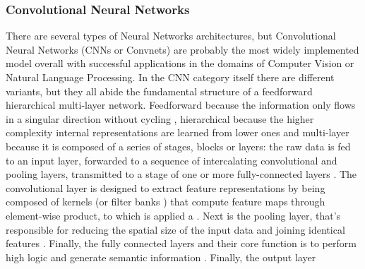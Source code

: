 \documentclass[class=report, crop=false, a4paper, 12pt]{standalone}
\begin{document}
\subsubsection{Convolutional Neural Networks}
There are several types of Neural Networks architectures, but Convolutional Neural Networks (CNNs or Convnets) are probably the most widely implemented model overall \autocite{yamashitaConvolutionalNeuralNetworks2018, liSurveyConvolutionalNeural2022} with successful applications in the domains of Computer Vision \autocite{krizhevskyImageNetClassificationDeep2012,taigmanDeepFaceClosingGap2014,tompsonEfficientObjectLocalization2015, zhangImprovedBreastCancer2021} or Natural Language Processing\autocite{abdel-hamidConvolutionalNeuralNetworks2014, wangGenCNNConvolutionalArchitecture2015, xiangConvolutionalNeuralNetworkbased2020}. In the CNN category itself there are different variants, but they all abide the fundamental structure of a feedforward hierarchical multi-layer network. Feedforward because the information only flows in a singular direction without cycling \autocite{zellSimulationNeuronalerNetze1994}, hierarchical because the higher complexity internal representations are learned from lower ones \autocite{lecunDeepLearning2015, zhuBCNNBranchConvolutional2017} and multi-layer because it is composed of a series of stages, blocks or layers: the raw data is fed to an input layer, forwarded to a sequence of intercalating convolutional and pooling layers, transmitted to a stage of one or more fully-connected layers \autocite{lecunDeepLearning2015, yamashitaConvolutionalNeuralNetworks2018, guRecentAdvancesConvolutional2018, alzubaidiReviewDeepLearning2021}. The convolutional layer is designed to extract feature representations by being composed of kernels (or filter banks \autocite{lecunDeepLearning2015}) that compute feature maps through element-wise product, to which is applied a  \autocite{guRecentAdvancesConvolutional2018,yamashitaConvolutionalNeuralNetworks2018}. Next is the pooling layer, that's responsible for reducing the spatial size of the input data \autocite{guRecentAdvancesConvolutional2018} and joining identical features \autocite{lecunDeepLearning2015}. Finally, the fully connected layers and their core function is to perform high logic and generate semantic information \autocite{guRecentAdvancesConvolutional2018}. Finally, the output layer 

\end{document}

